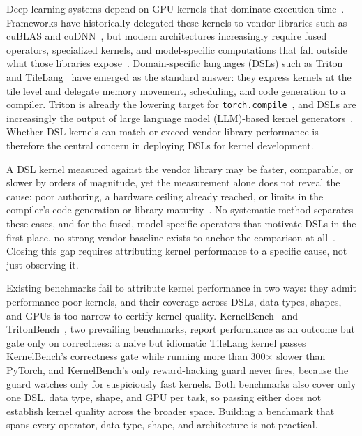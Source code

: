 
Deep learning systems depend on GPU kernels that dominate execution time~\cite{acceleration_survey, optimization_survey}. Frameworks have historically delegated these kernels to vendor libraries such as cuBLAS and cuDNN~\cite{cublas2024, chetlur2014cudnn}, but modern architectures increasingly require fused operators, specialized kernels, and model-specific computations that fall outside what those libraries expose~\cite{kernelfusion}. Domain-specific languages (DSLs) such as Triton~\cite{openai2021triton} and TileLang~\cite{wang2025tilelang} have emerged as the standard answer: they express kernels at the tile level and delegate memory movement, scheduling, and code generation to a compiler. Triton is already the lowering target for \texttt{torch.compile}~\cite{li2023torchcompile}, and DSLs are increasingly the output of large language model (LLM)-based kernel generators~\cite{kernelbench}. Whether DSL kernels can match or exceed vendor library performance is therefore the central concern in deploying DSLs for kernel development.

A DSL kernel measured against the vendor library may be faster, comparable, or slower by orders of magnitude, yet the measurement alone does not reveal the cause: poor authoring, a hardware ceiling already reached, or limits in the compiler's code generation or library maturity~\cite{williams2009roofline,yang2020hierarchical}. No systematic method separates these cases, and for the fused, model-specific operators that motivate DSLs in the first place, no strong vendor baseline exists to anchor the comparison at all~\cite{dao2023flashattention2}. Closing this gap requires attributing kernel performance to a specific cause, not just observing it.

Existing benchmarks  fail to attribute kernel performance in two ways: they admit performance-poor kernels, and their coverage across DSLs, data types, shapes, and GPUs is too narrow to certify kernel quality. KernelBench~\cite{kernelbench} and TritonBench~\cite{li2025tritonbench}, two prevailing benchmarks, report performance as an outcome but gate only on correctness: a naive but idiomatic TileLang kernel passes KernelBench's correctness gate while running more than 300$\times$ slower than PyTorch, and KernelBench's only reward-hacking guard never fires, because the guard watches only for suspiciously fast kernels. Both benchmarks also cover only one DSL, data type, shape, and GPU per task, so passing either does not establish kernel quality across the broader space. Building a benchmark that spans every operator, data type, shape, and architecture is not practical.

